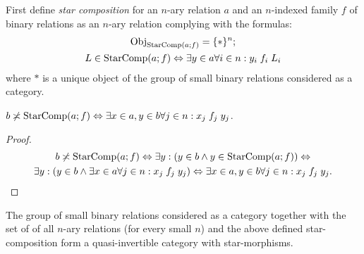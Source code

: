 First define \emph{star composition} for an $n$-ary relation $a$
and an $n$-indexed family $f$ of binary relations as an $n$-ary
relation complying with the formulas:
\begin{gather*}
\operatorname{Obj}_{\operatorname{StarComp}(a;f)}=\{\ast\}^{n};\\
L\in\operatorname{StarComp}(a;f)\Leftrightarrow\exists y\in a\forall i\in n:y_{i}\mathrel{f_{i}}L_{i}
\end{gather*}
where $\ast$ is a unique object of the group of small binary relations
considered as a category.
\begin{prop}
$b\not\asymp\operatorname{StarComp}(a;f)\Leftrightarrow\exists x\in a,y\in b\forall j\in n:x_{j}\mathrel{f_{j}}y_{j}$.\end{prop}
\begin{proof}
~
\begin{multline*}
b\not\asymp\operatorname{StarComp}(a;f)\Leftrightarrow\exists y:(y\in b\land y\in\operatorname{StarComp}(a;f))\Leftrightarrow\\
\exists y:(y\in b\land\exists x\in a\forall j\in n:x_{j}\mathrel{f_{j}}y_{j})\Leftrightarrow\exists x\in a,y\in b\forall j\in n:x_{j}\mathrel{f_{j}}y_{j}.
\end{multline*}
\end{proof}
\begin{thm}
The group of small binary relations considered as a category together
with the set of of all $n$-ary relations (for every small $n$) and
the above defined star-composition form a quasi-invertible category
with star-morphisms.\end{thm}
